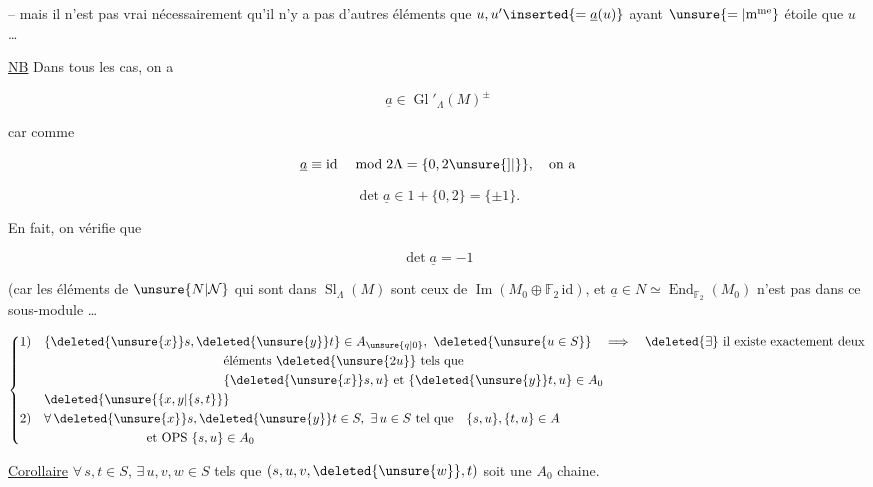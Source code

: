 -- mais il n'est pas vrai nécessairement qu'il n'y a pas d'autres éléments que $u,u'\inserted{=\underline a(u)}$ ayant $\unsure{=|\text{m\textsuperscript{me}}}$ étoile que $u$ \ldots\ 

\uline{NB} Dans tous les cas, on a

\[
\underline a\in\operatorname{Gl}'_\Lambda(M)^{\pm}
\]

car comme

\[
\underline a\equiv\mathrm{id}\quad\bmod 2\Lambda=\{0,2\unsure{]|\}},\quad\text{on a}
\]

\[
\det\underline a\in1+\{0,2\}=\{\pm1\}.
\]

En fait, on vérifie que

\[
\det\underline a=-1
\]

(car les éléments de $\unsure{N|\mathcal N}$ qui sont dans $\operatorname{Sl}_\Lambda(M)$ sont ceux de $\operatorname{Im}(M_0\oplus\mathbb F_2\,\mathrm{id})$, et $\underline a\in N\simeq\operatorname{End}_{\mathbb F_2}(M_0)$ n'est pas dans ce sous-module \ldots

\[
\left\{\begin{aligned}
1)\quad &\{\deleted{\unsure{x}}s,\deleted{\unsure{y}}t\}\in A_{\unsure{q|0}},\ \deleted{\unsure{u\in S}}\quad\Longrightarrow\quad
\deleted{\exists}\ \text{il existe exactement deux}\\
&\hspace{14em}\text{éléments }\deleted{\unsure{2u}}\ \text{tels que}\\
&\hspace{14em}\{\deleted{\unsure{x}}s,u\}\ \text{et }\{\deleted{\unsure{y}}t,u\}\in A_0\\
&\deleted{\unsure{\{x,y|\{s,t\}}}\\
2)\quad &\forall\,\deleted{\unsure{x}}s,\deleted{\unsure{y}}t\in S,\ \exists\,u\in S\ \text{tel que}\quad\{s,u\},\{t,u\}\in A\\
&\hspace{8em}\text{et OPS }\{s,u\}\in A_0
\end{aligned}\right.
\]

\qquad \uline{Corollaire} $\forall\,s,t\in S$, $\exists\,u,v,w\in S$ tels que $(s,u,v,\deleted{\unsure{w}},t)$ soit une $A_0$ chaine.


